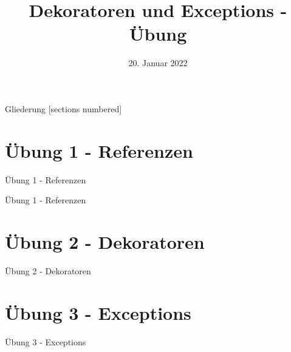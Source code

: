 



\title{Dekoratoren und Exceptions - Übung}
\date{20. Januar 2022}


\maketitle

\begin{frame}{Gliederung}
	[sections numbered]
	\tableofcontents
\end{frame}


\section{Übung 1 - Referenzen}
\begin{frame}{Übung 1 - Referenzen}
	
\end{frame}

\begin{frame}{Übung 1 - Referenzen}
	
\end{frame}


\section{Übung 2 - Dekoratoren}
\begin{frame}{Übung 2 - Dekoratoren}
	
\end{frame}


\section{Übung 3 - Exceptions}
\begin{frame}{Übung 3 - Exceptions}
	
\end{frame}



